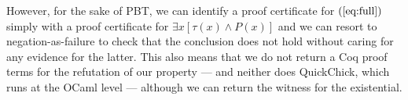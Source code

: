 %
However, for the sake of PBT, we can identify a proof certificate for
$(\ref{eq:full})$ simply with a proof certificate for
$
  \exists x [\tau(x)\wedge P(x)]
$
and we can resort to negation-as-failure to check that the conclusion does not hold without caring for any evidence for the latter. This also means that we do not return a Coq proof terms for the refutation of our property --- and neither does \textsf{QuickChick}, which runs at the OCaml level --- although we can return the witness for the existential.
%


